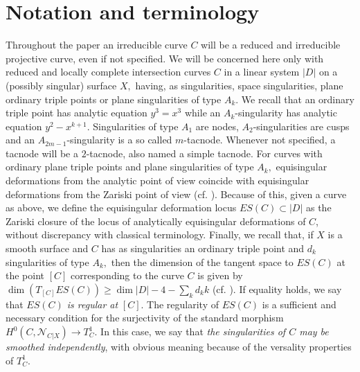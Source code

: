 \documentclass[plain]{amsart}
\def\N{\mathcal N}
\begin{document}
\section{Notation and terminology}\label{notation-terminology}
Throughout the paper an irreducible curve $C$ will be a reduced and irreducible projective curve,
even if not specified. We will be concerned here only with reduced and locally complete intersection curves
 $C$ in a linear system $|D|$ on a (possibly singular) surface $X,$ having, as singularities, space
 singularities, plane ordinary triple points or plane singularities of type $A_k.$
 We recall that an ordinary triple point has analytic equation $y^3=x^3$ while an $A_k$-singularity has 
 analytic equation $y^2-x^{k+1}.$ Singularities of type $A_1$ are nodes,
$A_2$-singularities are cusps and an $A_{2m-1}$-singularity is a so called $m$-tacnode.
Whenever not specified, a tacnode will be a $2$-tacnode, also named a simple tacnode. 
For curves with ordinary plane triple points and plane singularities of type $A_k,$  equisingular
deformations from the analytic point of view coincide with equisingular deformations from the Zariski 
point of view (cf. \cite[Definition (3.13)]{diaz_harris}). Because of this,  given a curve as above,
we define the equisingular deformation locus $ES(C)\subset |D|$ as the Zariski closure of the locus of 
analytically equisingular deformations
of $C$, without discrepancy with classical terminology. 
Finally, we recall that, if $X$ is a smooth surface and $C$ has as singularities an ordinary triple
point and $d_k$ singularities of type $A_k,$ then the dimension of the tangent space to $ES(C)$ at the
point $[C]$ corresponding to the curve $C$ is given by $\dim(T_{[C]}ES(C))\geq\dim|D|-4-\sum_kd_k k$
(cf. \cite{diaz_harris}).
If equality holds, we say that {\em $ES(C)$ is regular at } $[C].$ The regularity of 
 $ES(C)$ is a sufficient and necessary condition for the surjectivity 
of  the standard morphism
$H^0(C,\N_{C|X})\to T^1_C.$ In this case, we say that {\em the singularities
of $C$ may be smoothed independently}, with obvious meaning because of the versality properties of 
$T^1_C.$
\end{document}
